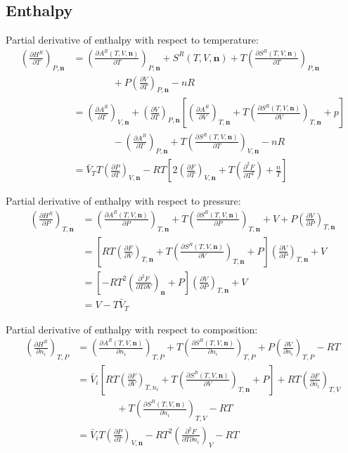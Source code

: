 \documentclass[english]{../thermomemo/thermomemo}
\numberwithin{equation}{section}
\newcommand*{\pder}[2]{\left(\frac{\partial #1}{\partial #2}\right)}
\newcommand*{\pdder}[2]{\left(\frac{\partial^2 #1}{\partial #2^2}\right)}
\newcommand*{\pdcross}[3]{\left(\frac{\partial^2 #1}{\partial #2 \partial #3}\right)}
\begin{document}
\subsection{Enthalpy}
Partial derivative of enthalpy with respect to temperature:
\begin{equation}
\begin{split}
\pder{H^R}{T}_{P, \textbf{n}} & = \pder{A^R(T,V,\textbf{n})}{T}_{P, \textbf{n}} + S^R(T,V,\textbf{n}) + T \pder{S^R(T,V,\textbf{n})}{T}_{P, \textbf{n}} \\
& \qquad \qquad + P \pder{V}{T}_{P,\textbf{n}} - nR \\
& = \pder{A^R}{T}_{V,\textbf{n}} +\pder{V}{T}_{P,\textbf{n}} \left[ \pder{A^R}{V}_{T,\textbf{n}} + T \pder{S^R(T,V,\textbf{n})}{V}_{T,\textbf{n}} + p \right] \\
& \qquad \qquad - \pder{A^R}{T}_{P,\textbf{n}} + T\pder{S^R(T,V,\textbf{n})}{T}_{V,\textbf{n}} - nR \\
& = \bar{V}_T T \pder{P}{T}_{V,\textbf{n}} - RT \left[ 2\pder{F}{T}_{V,\textbf{n}} + T \pdder{F}{T} + \frac{n}{T} \right]
\end{split}
\end{equation}

Partial derivative of enthalpy with respect to pressure:
\begin{equation}
\begin{split}
\pder{H^R}{P}_{T, \textbf{n}} & =  \pder{A^R(T,V,\textbf{n})}{P}_{T, \textbf{n}} + T \pder{S^R(T,V,\textbf{n})}{P}_{T, \textbf{n}} + V + P \pder{V}{P}_{T,\textbf{n}} \\
& = \left[ RT \pder{F}{V}_{T,\textbf{n}} + T \pder{S^R(T,V,\textbf{n})}{V}_{T,\textbf{n}} + P \right] \pder{V}{P}_{T,\textbf{n}} + V \\
& = \left[- RT^2 \pdcross{F}{T}{V}_{\textbf{n}}  + P \right] \pder{V}{P}_{T,\textbf{n}} + V \\
& = V - T \bar{V}_T
\end{split}
\end{equation}

Partial derivative of enthalpy with respect to composition:
\begin{equation}
\begin{split}
\pder{H^R}{n_i}_{T,P} & = \pder{A^R(T,V,\textbf{n})}{n_i}_{T,P} + T \pder{S^R(T,V,\textbf{n})}{n_i}_{T,P} + P \pder{V}{n_i}_{T,P} - RT \\
& = \bar{V}_i \left[ RT \pder{F}{V}_{T,n_i} + T \pder{S^R(T,V,\textbf{n})}{V}_{T,\textbf{n}} + P \right] + RT\pder{F}{n_i}_{T,V}  \\
& \qquad \qquad  + T\pder{S^R(T,V,\textbf{n})}{n_i}_{T,V}  - RT \\
& = \bar{V}_i T \pder{P}{T}_{V,\textbf{n}} -RT^2 \pdcross{F}{T}{n_i}_V - RT
\end{split} 
\end{equation}
\end{document}
